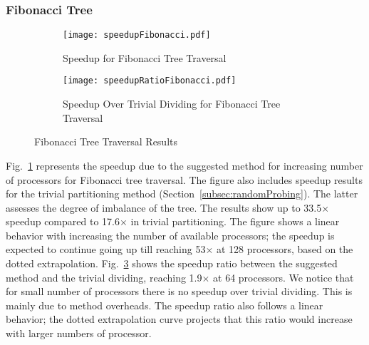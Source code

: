 \documentclass[conference,compsoc]{IEEEtran}
\begin{document}
\subsubsection{Fibonacci Tree}
\begin{figure}
	\begin{subfigure}{\columnwidth}
		\centering
		\texttt{[image: speedupFibonacci.pdf]}
		\caption{Speedup for Fibonacci Tree Traversal}
		\label{figSpeedupFibonacci}
	\end{subfigure}
	\begin{subfigure}{\columnwidth}
		\centering
		\texttt{[image: speedupRatioFibonacci.pdf]}
		\caption{Speedup Over Trivial Dividing for Fibonacci Tree Traversal}
		\label{figSpeedupRatioFibonacci}
	\end{subfigure}
	\caption{Fibonacci Tree Traversal Results}
\end{figure}
Fig.~\ref{figSpeedupFibonacci} represents the speedup due to the suggested method for increasing number of processors for Fibonacci tree traversal. The figure also includes speedup results for the trivial partitioning method (Section~\ref{subsec:randomProbing}). The latter assesses the degree of imbalance of the tree. The results show up to 33.5$\times$ speedup compared to 17.6$\times$ in trivial partitioning. The figure shows a linear behavior with increasing the number of available processors; the speedup is expected to continue going up till reaching 53$\times$ at 128 processors, based on the dotted extrapolation. Fig.~\ref{figSpeedupRatioFibonacci} shows the speedup ratio between the suggested method and the trivial dividing, reaching 1.9$\times$ at 64 processors. We notice that for small number of processors there is no speedup over trivial dividing. This is mainly due to method overheads. The speedup ratio also follows a linear behavior; the dotted extrapolation curve projects that this ratio would increase with larger numbers of processor.
\end{document}
